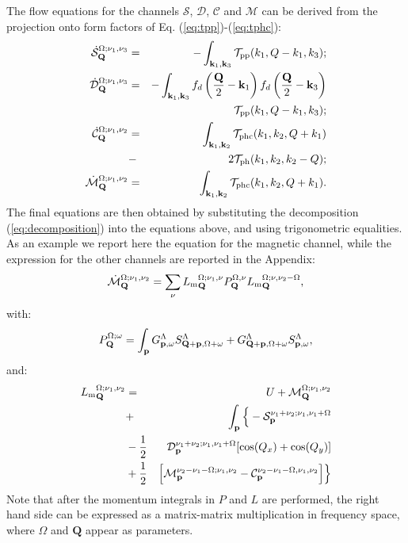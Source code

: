 The flow equations for the channels $\mathcal{S}$,  $\mathcal{D}$, $\mathcal{C}$ and $\mathcal{M}$ can be derived from the projection onto form factors of Eq. (\ref{eq:tpp})-(\ref{eq:tphc}):
\begin{eqnarray}
\dot{\mathcal{S}}_{\mathbf{Q}}^{\Omega;\nu_1,\nu_3}  &=& - \int _{\mathbf{k}_1, \mathbf{k}_3 } \mathcal{T}_{\mathrm{pp}}(k_1,Q-k_1,k_3); \\ 
\dot{\mathcal{D}}_{\mathbf{Q}}^{\Omega;\nu_1,\nu_3}  &=& -
\int _{\mathbf{k}_1,\mathbf{k}_3}  f_d\left( {\frac{\mathbf{Q}}{2} - \mathbf{k}_1} \right ) f_d\left ({\frac{\mathbf{Q}}{2} - \mathbf{k}_3} \right)  \nonumber \\ 
 &&\mathcal{T}_{\mathrm{pp}}(k_1,Q-k_1,k_3) ; 
\\
\nonumber
\dot{\mathcal{C}}_{\mathbf{Q}}^{\Omega;\nu_1,\nu_2} &=& 
\int _{\mathbf{k}_1,\mathbf{k}_2}   \mathcal{T}_{\mathrm{phc}}(k_1,k_2,Q+k_1)\\ &-&2\mathcal{T}_{\mathrm{ph}}(k_1,k_2,k_2-Q) ; 
\\ 
\dot{\mathcal{M}}_{\mathbf{Q}}^{\Omega;\nu_1,\nu_2} & =& 
\int _{\mathbf{k}_1,\mathbf{k}_2}  \mathcal{T}_{\mathrm{phc}}(k_1,k_2,Q+k_1). 
\end{eqnarray}
The final equations are then obtained by substituting the decomposition (\ref{eq:decomposition}) into the equations above, and using trigonometric equalities.
As an example we report here the equation for the magnetic channel, while the expression for the other channels are reported in the Appendix: 
\begin{equation}
\dot{\mathcal{M}}_{\mathbf{Q}}^{\Omega;\nu_1,\nu_2} = \sum_{\nu}{L_\mathrm{m}}^{\Omega; \nu_1,\nu}_{\mathbf{Q}} P_{\mathbf{Q}}^{\Omega,\nu} {L_\mathrm{m}}^{\Omega; \nu,\nu_2-\Omega}_{\mathbf{Q}}, 
\end{equation} 	   
with: 
\begin{equation}
P_{\mathbf{Q}}^{\Omega;\omega} = \int_{\mathbf{p}}  G^\Lambda_{\mathbf{p},\omega}S^\Lambda_{\mathbf{Q}+\mathbf{p},\Omega+\omega} +G^\Lambda_{\mathbf{Q}+\mathbf{p},\Omega+\omega}
S^\Lambda_{\mathbf{p},\omega}, 
\end{equation} 
and: 
\begin{eqnarray} 
\nonumber
{L_\mathrm{m}}^{\Omega;\nu_1,\nu_2}_{\mathbf{Q}}&=&U+\mathcal{M}_{\mathbf{Q}}^{\Omega;\nu_1,\nu_2} \\
\nonumber 
&+& \int_{\mathbf{p}} \Big \{- \mathcal{S}_{\mathbf{p}}^{\nu_1+\nu_2;\nu_1,\nu_1+\Omega}  
 \\
 \nonumber 
&-\frac{1}{2}& \mathcal{D}_{\mathbf{p}}^{\nu_1+\nu_2;\nu_1,\nu_1+\Omega}
[\cos(Q_x)+\cos(Q_y)]
 \\ 
&+\frac{1}{2}& \Big[  \mathcal{M}_{\mathbf{p}}^{\nu_2-\nu_1-\Omega; \nu_1,\nu_2} 
- \mathcal{C}_{\mathbf{p}}^{\nu_2-\nu_1-\Omega,\nu_1,\nu_2} \Big] 
\Big \} 
\end{eqnarray}	 
Note that after the momentum integrals in $P$ and $L$ are performed, the right hand side can be expressed as a matrix-matrix multiplication in frequency space, where $\Omega$ and $\mathbf{Q}$ appear as parameters.

